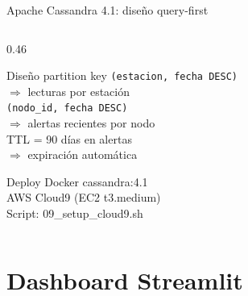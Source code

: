 \documentclass[14pt,aspectratio=169]{beamer}
\begin{document}
\begin{frame}{Apache Cassandra 4.1: dise\~no query-first}
\begin{columns}[T]
    \begin{column}{0.46\textwidth}
      \begin{exampleblock}{Dise\~no partition key}
        \vspace{0.2em}
        \footnotesize
        \texttt{(estacion, fecha DESC)}\\
        $\Rightarrow$ lecturas por estaci\'on\\[0.3em]
        \texttt{(nodo\_id, fecha DESC)}\\
        $\Rightarrow$ alertas recientes por nodo\\[0.3em]
        TTL = 90 d\'ias en alertas\\
        $\Rightarrow$ expiraci\'on autom\'atica
        \vspace{0.2em}
      \end{exampleblock}
      \vspace{0.3em}
      \begin{block}{Deploy}
        \footnotesize
        Docker cassandra:4.1\\
        AWS Cloud9 (EC2 t3.medium)\\
        Script: 09\_setup\_cloud9.sh
      \end{block}
    \end{column}
  \end{columns}
\end{frame}

\section{Dashboard Streamlit}
\end{document}
